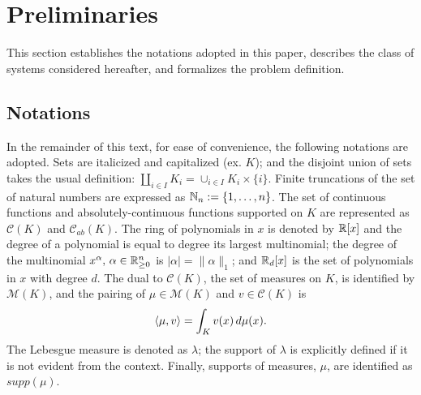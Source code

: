   \section{Preliminaries}
\label{sec:preliminaries}
  This section establishes the notations adopted in this paper, describes the class of systems considered hereafter, and formalizes the problem definition.
  \subsection{Notations}
  In the remainder of this text, for ease of convenience, the following notations are adopted. Sets are italicized and capitalized (ex. $K$); and the disjoint union of sets takes the usual definition: $\coprod_{i\in I}K_i=\cup_{i\in I}K_i\times \{i\}$. Finite truncations of the set of natural numbers are expressed as \mbox{$\mathbb{N}_n:=\{1,\ldots,n\}$}. The set of continuous functions and absolutely-continuous functions supported on $K$ are represented as $\mathcal C(K)$ and $\mathcal C_{ab}(K)$. The ring of polynomials in $x$ is denoted by $\mathbb{R}[x]$ and the degree of a polynomial is equal to degree its largest multinomial; the degree of the multinomial $x^\alpha,\,\alpha\in \mathbb{R}_{\ge 0}^n$ is $|\alpha|=\|\alpha\|_1$; and $\mathbb{R}_d[x]$ is the set of polynomials in $x$ with degree $d$. The dual to $\mathcal C(K)$, the set of measures on $K$, is identified by $\mathcal M(K)$, and the pairing of $\mu\in \mathcal M(K)$ and $v\in \mathcal C(K)$ is
  \begin{align}
  \left\langle \mu,v\right\rangle=\int_{K}v(x)\,d\mu(x).
  \end{align}
  The Lebesgue measure is denoted as $\lambda$; the support of $\lambda$ is explicitly defined if it is not evident from the context. Finally, supports of measures, $\mu$, are identified as $supp(\mu)$.
